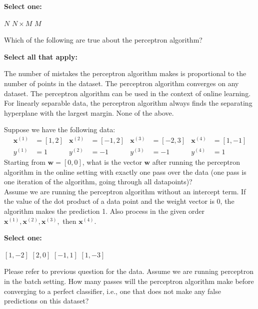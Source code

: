 \documentclass[11pt,addpoints,answers]{exam}
\numberwithin{equation}{section} %
\numberwithin{figure}{section} %
\numberwithin{table}{section} %
\newcommand{\wv}{\mathbf{w}}
\newcommand{\xv}{\mathbf{x}}
\begin{document}
\begin{questions}
    \textbf{Select one:}
    \begin{checkboxes}
        \choice $N$
        \choice $N\times M$
        \CorrectChoice $M$
    \end{checkboxes}


    
    \question[2] Which of the following are true about the perceptron algorithm?

    \textbf{Select all that apply:}
    {%
    \checkboxchar{$\Box$} \checkedchar{$\blacksquare$}
    \begin{checkboxes}
        \choice The number of mistakes the perceptron algorithm makes is proportional to the number of points in the dataset. 
        \choice The perceptron algorithm converges on any dataset.
        \CorrectChoice The perceptron algorithm can be used in the context of online learning.
        \CorrectChoice For linearly separable data, the perceptron algorithm always finds the separating hyperplane with the largest margin.
        \choice None of the above.
    \end{checkboxes}
    }

    
    
    \question[3] Suppose we have the following data:     \begin{align*}
        \xv^{(1)} &= [1,2] & \xv^{(2)} &= [-1,2] & \xv^{(3)} &= [-2,3] & \xv^{(4)} &= [1,-1] \\
        y^{(1)} &= 1 & y^{(2)} &= -1 & y^{(3)} &= -1 & y^{(4)} &= 1
    \end{align*}
    Starting from $\wv = [0,0]$, what is the vector $\wv$ after running the perceptron algorithm in the online setting with exactly one pass over the data (one pass is one iteration of the algorithm, going through all datapoints)? \\
    Assume we are running the perceptron algorithm without an intercept term. If the value of the dot product of a data point and the weight vector is $0$, the algorithm makes the prediction 1. Also process in the given order $\xv^{(1)}, \xv^{(2)}, \xv^{(3)},$ then $\xv^{(4)}$.

    \textbf{Select one:}
    \begin{checkboxes}
        \choice $[1,-2]$
        \CorrectChoice $[2,0]$
        \choice $[-1,1]$
        \choice $[1,-3]$
    \end{checkboxes}

    
    
    \clearpage

    \question[2] Please refer to previous question for the data. Assume we are running perceptron in the batch setting. How many passes will the perceptron algorithm make before converging to a perfect classifier, i.e., one that does not make any false predictions on this dataset?


\end{questions}
\end{document}
